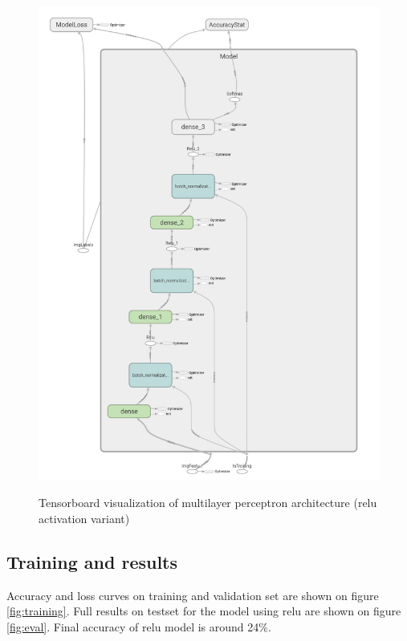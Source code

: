 \documentclass[a4paper]{article}
\begin{document}
\begin{figure}[h]
    \caption[]{Tensorboard visualization of multilayer perceptron architecture (relu activation variant)}
    \centering
    \includegraphics[page=2,width=1.0\textwidth]{architecture.png}
    \label{fig:arch}
\end{figure}

\subsection{Training and results}
Accuracy and loss curves on training and validation set are shown on figure \ref{fig:training}.
Full results on testset for the model using relu are shown on figure \ref{fig:eval}.
Final accuracy of relu model is around 24\%.
\end{document}
